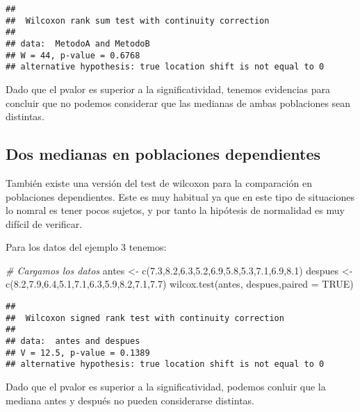 \documentclass[
]{book}
\newenvironment{Shaded}{\begin{snugshade}}{\end{snugshade}}
\newcommand{\AttributeTok}[1]{\textcolor[rgb]{0.77,0.63,0.00}{#1}}
\newcommand{\CommentTok}[1]{\textcolor[rgb]{0.56,0.35,0.01}{\textit{#1}}}
\newcommand{\ConstantTok}[1]{\textcolor[rgb]{0.00,0.00,0.00}{#1}}
\newcommand{\FloatTok}[1]{\textcolor[rgb]{0.00,0.00,0.81}{#1}}
\newcommand{\FunctionTok}[1]{\textcolor[rgb]{0.00,0.00,0.00}{#1}}
\newcommand{\NormalTok}[1]{#1}
\newcommand{\OtherTok}[1]{\textcolor[rgb]{0.56,0.35,0.01}{#1}}
\begin{document}
\begin{verbatim}
## 
##  Wilcoxon rank sum test with continuity correction
## 
## data:  MetodoA and MetodoB
## W = 44, p-value = 0.6768
## alternative hypothesis: true location shift is not equal to 0
\end{verbatim}

Dado que el pvalor es superior a la significatividad, tenemos evidencias para concluir que no podemos considerar que las medianas de ambas poblaciones sean distintas.

\hypertarget{dos-medianas-en-poblaciones-dependientes}{%
\subsection{Dos medianas en poblaciones dependientes}\label{dos-medianas-en-poblaciones-dependientes}}

También existe una versión del test de wilcoxon para la comparación en poblaciones dependientes. Este es muy habitual ya que en este tipo de situaciones lo nomral es tener pocos sujetos, y por tanto la hipótesis de normalidad es muy difícil de verificar.

Para los datos del ejemplo 3 tenemos:

\begin{Shaded}
\begin{Highlighting}[]
\CommentTok{\# Cargamos los datos}
\NormalTok{antes }\OtherTok{\textless{}{-}} \FunctionTok{c}\NormalTok{(}\FloatTok{7.3}\NormalTok{,}\FloatTok{8.2}\NormalTok{,}\FloatTok{6.3}\NormalTok{,}\FloatTok{5.2}\NormalTok{,}\FloatTok{6.9}\NormalTok{,}\FloatTok{5.8}\NormalTok{,}\FloatTok{5.3}\NormalTok{,}\FloatTok{7.1}\NormalTok{,}\FloatTok{6.9}\NormalTok{,}\FloatTok{8.1}\NormalTok{)}
\NormalTok{despues }\OtherTok{\textless{}{-}} \FunctionTok{c}\NormalTok{(}\FloatTok{8.2}\NormalTok{,}\FloatTok{7.9}\NormalTok{,}\FloatTok{6.4}\NormalTok{,}\FloatTok{5.1}\NormalTok{,}\FloatTok{7.1}\NormalTok{,}\FloatTok{6.3}\NormalTok{,}\FloatTok{5.9}\NormalTok{,}\FloatTok{8.2}\NormalTok{,}\FloatTok{7.1}\NormalTok{,}\FloatTok{7.7}\NormalTok{)}
\FunctionTok{wilcox.test}\NormalTok{(antes, despues,}\AttributeTok{paired =} \ConstantTok{TRUE}\NormalTok{)}
\end{Highlighting}
\end{Shaded}

\begin{verbatim}
## 
##  Wilcoxon signed rank test with continuity correction
## 
## data:  antes and despues
## V = 12.5, p-value = 0.1389
## alternative hypothesis: true location shift is not equal to 0
\end{verbatim}

Dado que el pvalor es superior a la significatividad, podemos conluir que la mediana antes y después no pueden considerarse distintas.
\end{document}
